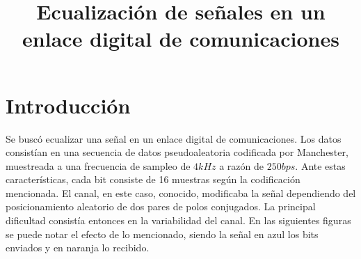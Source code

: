 \title{Ecualización de señales en un enlace digital de comunicaciones}

\author{
}

\maketitle

\begin{abstract}
\end{abstract}


\section{Introducción}
Se buscó ecualizar una señal en un enlace digital de comunicaciones. 
Los datos consistían en una secuencia de datos pseudoaleatoria 
codificada por Manchester, muestreada a una frecuencia de sampleo
 de $4kHz$ a razón de $250bps$. Ante estas características, cada bit consiste de 
 16 muestras según la codificación mencionada. El canal, en este caso, conocido, 
 modificaba la señal dependiendo del posicionamiento
 aleatorio de dos pares de polos conjugados.
La principal dificultad consistía entonces en la variabilidad del canal. En las 
siguientes figuras se puede notar el efecto de lo mencionado, siendo la 
señal en azul los bits enviados y en naranja lo recibido. \newline

